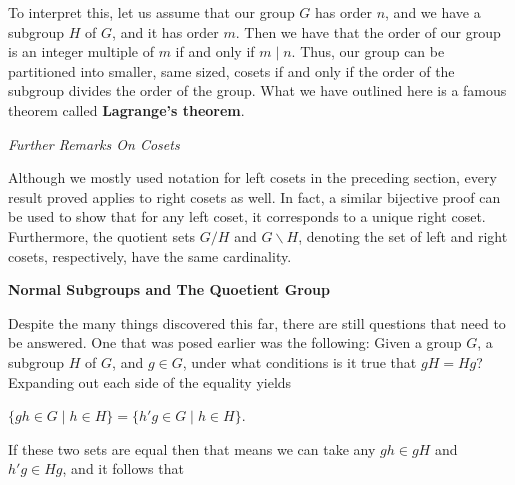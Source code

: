 \documentclass[12pt, a4paper]{article}
\begin{document}
\vspace{4mm}

    To interpret this, let us assume that our group $G$ has order $n$, and we have a subgroup $H$ of $G$, and it has order $m$. Then we have that the order of our group is an integer multiple of $m$ if and only if $m\mid n$. Thus, our group can be partitioned into smaller, same sized, cosets if and only if the order of the subgroup divides the order of the group. What we have outlined here is a famous theorem called \textbf{Lagrange's theorem}.
    
\newpage

\begin{flushleft}

\large{\textit {Further Remarks On Cosets}}\normalsize

\end{flushleft}

\begin{flushleft}

    Although we mostly used notation for left cosets in the preceding section, every result proved applies to right cosets as well. In fact, a similar bijective proof can be used to show that for any left coset, it corresponds to a unique right coset. Furthermore, the quotient sets $G/H$ and $G\backslash H$, denoting the set of left and right cosets, respectively, have the same cardinality.
    
\end{flushleft}

\begin{flushleft}

    \large{\textbf{Normal Subgroups and The Quoetient Group}}

\end{flushleft}

    Despite the many things discovered this far, there are still questions that need to be answered. One that was posed earlier was the following: Given a group $G$, a subgroup $H$ of $G$, and $g\in G$, under what conditions is it true that $gH=Hg$? Expanding out each side of the equality yields\par
    
\vspace{4mm}

        \centerline{$\{gh\in G\mid h\in H\}=\{h'g\in G\mid h\in H\}$.}
        
\vspace{4mm}

    If these two sets are equal then that means we can take any $gh\in gH$ and $h'g\in Hg$, and it follows that\par
    
\end{document}
